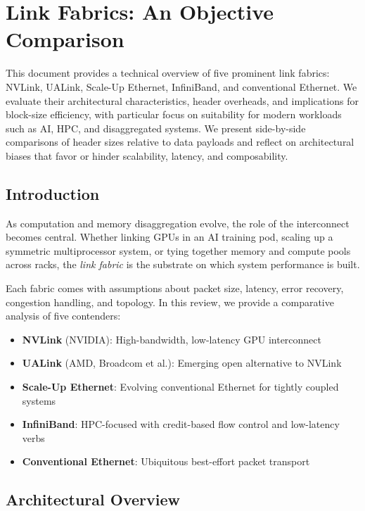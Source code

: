 \documentclass[../../../OAE-SPEC-MAIN.tex]{subfiles}
\begin{document}
\section{Link Fabrics: An Objective Comparison}

This document provides a technical overview of five prominent link fabrics: NVLink, UALink, Scale-Up Ethernet, InfiniBand, and conventional Ethernet. We evaluate their architectural characteristics, header overheads, and implications for block-size efficiency, with particular focus on suitability for modern workloads such as AI, HPC, and disaggregated systems. We present side-by-side comparisons of header sizes relative to data payloads and reflect on architectural biases that favor or hinder scalability, latency, and composability.


\subsection{Introduction}

As computation and memory disaggregation evolve, the role of the interconnect becomes central. Whether linking GPUs in an AI training pod, scaling up a symmetric multiprocessor system, or tying together memory and compute pools across racks, the \textit{link fabric} is the substrate on which system performance is built.

Each fabric comes with assumptions about packet size, latency, error recovery, congestion handling, and topology. In this review, we provide a comparative analysis of five contenders:

\begin{itemize}
  \item \textbf{NVLink} (NVIDIA): High-bandwidth, low-latency GPU interconnect
  \item \textbf{UALink} (AMD, Broadcom et al.): Emerging open alternative to NVLink
  \item \textbf{Scale-Up Ethernet}: Evolving conventional Ethernet for tightly coupled systems
  \item \textbf{InfiniBand}: HPC-focused with credit-based flow control and low-latency verbs
  \item \textbf{Conventional Ethernet}: Ubiquitous best-effort packet transport
\end{itemize}

\subsection{Architectural Overview}
\end{document}
